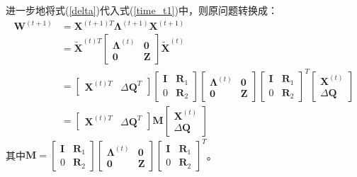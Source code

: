 进一步地将式(\ref{delta})代入式(\ref{time_t1})中，则原问题转换成：
\begin{equation}\label{time_t2}
	\begin{aligned}
	\textbf{W}^{(t+1)} &= \textbf{X}^{(t+1)T} \bm{\Lambda}^{(t+1)} \textbf{X} ^{(t+1)} \\
	&= \tilde{\textbf{X}}^{(t)T} 
	\begin{bmatrix}  \bm{\Lambda}^{(t)} & \textbf{0}\\
	\textbf{0} & \textbf{Z}
	\end{bmatrix}
	\tilde{\textbf{X}}^{(t)} \\
	&= \begin{bmatrix} \textbf{X}^{(t)T} & \Delta\textbf{Q}^{T} \end{bmatrix}\begin{bmatrix} \textbf{I} & \textbf{R}_1 \\
	0 & \textbf{R}_2 \end{bmatrix}
	\begin{bmatrix}  \bm{\Lambda}^{(t)} & \textbf{0}\\
	\textbf{0} & \textbf{Z} \end{bmatrix}
	\begin{bmatrix} \textbf{I} & \textbf{R}_1 \\
	0 & \textbf{R}_2 \end{bmatrix} ^T
	\begin{bmatrix} \textbf{X}^{(t)} \\ \Delta\textbf{Q} \end{bmatrix} \\
	&= \begin{bmatrix} \textbf{X}^{(t)T} & \Delta\textbf{Q}^{T} \end{bmatrix}
	  \textbf{M} \begin{bmatrix} \textbf{X}^{(t)} \\ \Delta\textbf{Q} \end{bmatrix} 
	\end{aligned}
\end{equation}
其中$\textbf{M}=\begin{bmatrix} \textbf{I} & \textbf{R}_1 \\
0 & \textbf{R}_2 \end{bmatrix}
\begin{bmatrix} \bm{\Lambda}^{(t)} & \textbf{0}\\
\textbf{0} & \textbf{Z} \end{bmatrix}
\begin{bmatrix} \textbf{I} & \textbf{R}_1 \\
0 & \textbf{R}_2 \end{bmatrix} ^T$。


